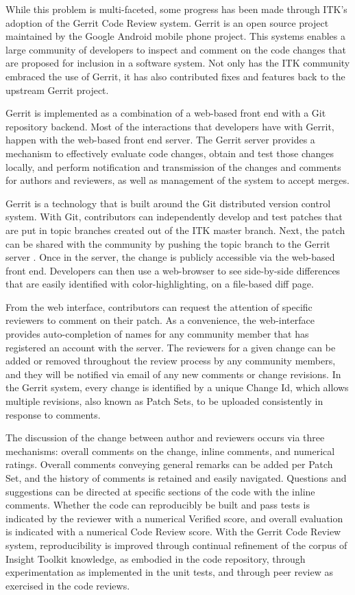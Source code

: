 \documentclass{frontiersENG} %
\begin{document}
While this problem is multi-faceted, some progress has been made through ITK’s
adoption of the Gerrit Code Review system.  Gerrit is an open source project
maintained by the Google Android mobile phone project. This systems enables a
large community of developers to inspect and comment on the code changes that
are proposed for inclusion in a software system. Not only has the ITK community
embraced the use of Gerrit, it has also contributed fixes and features back to
the upstream Gerrit project.

Gerrit is implemented as a combination of a web-based front end with a Git
repository backend. Most of the interactions that developers have with Gerrit,
happen with the web-based front end server. The Gerrit server provides a
mechanism to effectively evaluate code changes, obtain and test those changes
locally, and perform notification and transmission of the changes and comments
for authors and reviewers, as well as management of the system to accept
merges.

Gerrit is a technology that is built around the Git distributed version control
system.  With Git, contributors can independently develop and test patches that
are put in topic branches created out of the ITK master branch.  Next, the
patch can be shared with the community by pushing the topic branch to the
Gerrit server \cite{ITKGerrit}.  Once in the server, the change is publicly
accessible via the web-based front end.  Developers can then use a web-browser
to see side-by-side differences that are easily identified with
color-highlighting, on a file-based diff page.

From the web interface, contributors can request the attention of specific
reviewers to comment on their patch. As a convenience, the web-interface
provides auto-completion of names for any community member that has registered
an account with the server.  The reviewers for a given change can be added or
removed throughout the review process by any community members, and they will
be notified via email of any new comments or change revisions.  In the Gerrit
system, every change is identified by a unique Change Id, which allows multiple
revisions, also known as Patch Sets, to be uploaded consistently in response to
comments.

The discussion of the change between author and reviewers occurs via three
mechanisms: overall comments on the change, inline comments, and numerical
ratings. Overall comments conveying general remarks can be added per Patch
Set, and the history of comments is retained and easily navigated. Questions
and suggestions can be directed at specific sections of the code with the
inline comments. Whether the code can reproducibly be built and pass tests is
indicated by the reviewer with a numerical Verified score, and overall
evaluation is indicated with a numerical Code Review score. With the Gerrit
Code Review system, reproducibility is improved through continual refinement of
the corpus of Insight Toolkit knowledge, as embodied in the code repository,
through experimentation as implemented in the unit tests, and through peer
review as exercised in the code reviews.
\end{document}

